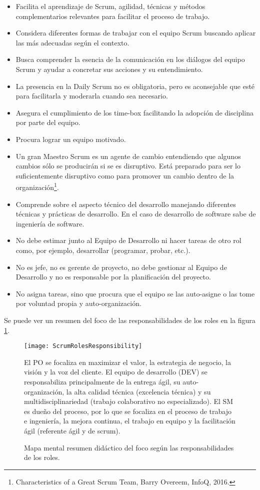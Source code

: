 \begin{itemize}
\item Facilita el aprendizaje de Scrum, agilidad, técnicas y métodos complementarios relevantes para facilitar el proceso de trabajo.
\item Considera diferentes formas de trabajar con el equipo Scrum buscando aplicar las más adecuadas según el contexto.
\item Busca comprender la esencia de la comunicación en los diálogos del equipo Scrum y ayudar a concretar sus acciones y su entendimiento.
\item La presencia en la Daily Scrum no es obligatoria, pero es aconsejable que esté para facilitarla y moderarla cuando sea necesario.
\item Asegura el cumplimiento de los time-box facilitando la adopción de disciplina por parte del equipo.
\item Procura lograr un equipo motivado.
\item Un gran Maestro Scrum es un agente de cambio entendiendo que algunos cambios sólo se producirán si se es disruptivo. Está preparado para ser lo suficientemente disruptivo como para promover un cambio dentro de la organización\footnote{Characteristics of a Great Scrum Team, Barry Overeem, InfoQ, 2016.}.
\item Comprende sobre el aspecto técnico del desarrollo manejando diferentes técnicas y prácticas de desarrollo. En el caso de desarrollo de software sabe de ingeniería de software.
\item No debe estimar junto al Equipo de Desarrollo ni hacer tareas de otro rol como, por ejemplo, desarrollar (programar, probar, etc.).
\item No es jefe, no es gerente de proyecto, no debe gestionar al Equipo de Desarrollo y no es responsable por la planificación del proyecto.
\item No asigna tareas, sino que procura que el equipo se las auto-asigne o las tome por voluntad propia y auto-organización.
\end{itemize}

Se puede ver un resumen del foco de las responsabilidades de los roles en la figura \ref{fig:ScrumRolesResponsibility}.

\begin{figure}
  \centering
  \texttt{[image: ScrumRolesResponsibility]}
  \caption{Mapa mental resumen didáctico del foco según las responsabilidades de los roles.} El PO se focaliza en maximizar el valor, la estrategia de negocio, la visión y la voz del cliente. El equipo de desarrollo (DEV) se responsabiliza principalmente de la entrega ágil, su auto-organización, la alta calidad técnica (excelencia técnica) y su multidisciplinariedad (trabajo colaborativo no especializado). El SM es dueño del proceso, por lo que se focaliza en el proceso de trabajo e ingeniería, la mejora continua, el trabajo en equipo y la facilitación ágil (referente ágil y de scrum).
  \centering
  \label{fig:ScrumRolesResponsibility} %
\end{figure}


